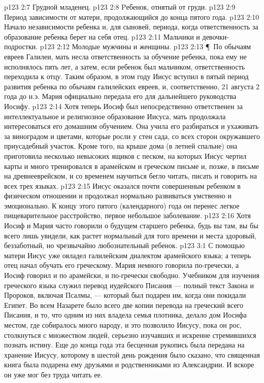 \vs p123 2:7 \bibnobreakspace Грудной младенец.
\vs p123 2:8 \bibnobreakspace Pебенок, отнятый от груди.
\vs p123 2:9 \bibnobreakspace Период зависимости от матери, продолжающийся до конца пятого года.
\vs p123 2:10 \bibnobreakspace Начало независимости ребенка и, для сыновей, периода, когда ответственность за образование ребенка берет на себя отец.
\vs p123 2:11 \bibnobreakspace Мальчики и девочки\hyp{}подростки.
\vs p123 2:12 \bibnobreakspace Молодые мужчины и женщины.
\vs p123 2:13 \P\ По обычаям евреев Галилеи, мать несла ответственность за обучение ребенка, пока ему не исполнялось пять лет, а затем, если ребенок был мальчиком, ответственность переходила к отцу. Таким образом, в этом году Иисус вступил в пятый период развития ребенка по обычаям галилейских евреев, и, соответственно, 21 августа 2 года до н.э. Мария официально передала его для дальнейшего руководства Иосифу.
\vs p123 2:14 Хотя теперь Иосиф был непосредственно ответственен за интеллектуальное и религиозное образование Иисуса, мать продолжала интересоваться его домашним обучением. Она учила его разбираться и ухаживать за виноградом и цветами, которые росли у стен сада, со всех сторон окружавшего приусадебный участок. Кроме того, на крыше дома (в летней спальне) она приготовила несколько невысоких ящиков с песком, на которых Иисус чертил карты и много тренировался в арамейском и греческом письме и, позже, в письме на древнееврейском, и со временем научиться бегло читать, писать и говорить на всех трех языках.
\vs p123 2:15 Иисус оказался почти совершенным ребенком в физическом отношении и продолжал нормально развиваться умственно и эмоционально. К концу этого пятого (календарного) года он перенес легкое пищеварительное расстройство, первое небольшое заболевание.
\vs p123 2:16 Хотя Иосиф и Мария часто говорили о будущем старшего ребенка, будь вы там, вы бы всего лишь увидели, как растет нормальный для того времени и места здоровый, беззаботный, но чрезвычайно любознательный ребенок.
\vs p123 3:1 С помощью матери Иисус уже овладел галилейским диалектом арамейского языка; а теперь отец начал обучать его греческому. Мария немного говорила по\hyp{}гречески, а Иосиф говорил и по арамейски, и по\hyp{}гречески свободно. Учебником для изучения греческого языка служил перевод иудейского Писания --- полный текст Закона и Пророков, включая Псалмы, --- который был подарен им, когда они покидали Египет. Во всем Назарете было всего две копии перевода на греческий всего Писания, и то, что одним из них владела семья плотника, делало дом Иосифа местом, где собиралось много народу, и это позволило Иисусу, пока он рос, столкнуться с множеством людей, серьезно изучавших и искренне стремившихся познать истину. Еще до конца года эта бесценная рукопись была передана на хранение Иисусу, которому в шестой день рождения было сказано, что священная книга была подарена ему друзьями и родственниками из Александрии. И вскоре он уже мог без труда читать ее.
